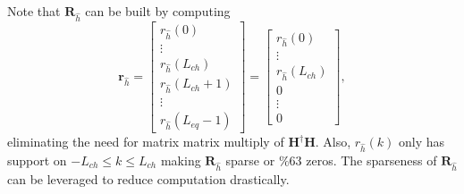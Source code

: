 Note that $\mathbf{R}_{\hat{h}}$ can be built by computing
\begin{equation}
\mathbf{r}_{\hat{h}} = 
\begin{bmatrix} r_{\hat{h}}(0) \\ \vdots \\ r_{\hat{h}}(L_{ch}) \\ r_{\hat{h}}(L_{ch}+1) \\ \vdots \\ r_{\hat{h}}(L_{eq}-1)\end{bmatrix} =
\begin{bmatrix} r_{\hat{h}}(0) \\ \vdots \\ r_{\hat{h}}(L_{ch}) \\ 0 \\ \vdots \\ 0  \end{bmatrix},
\end{equation} 
eliminating the need for matrix matrix multiply of $\mathbf{H}^\dagger\mathbf{H}$.
Also, $r_{\hat{h}}(k)$ only has support on $-L_{ch} \leq k \leq L_{ch}$ making $\mathbf{R}_{\hat{h}}$ sparse or $\%63$ zeros.
The sparseness of $\mathbf{R}_{\hat{h}}$ can be leveraged to reduce computation drastically.

